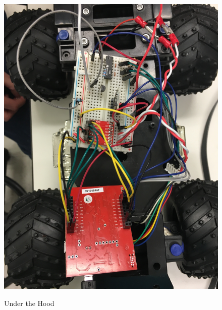 \documentclass[12pt]{article}
\begin{document}
\begin{figure}[H]
\begin {center}
\includegraphics[scale=.10]{car-guts}\\
\caption{Under the Hood}
\label{fig:hood}
\end {center}
\end{figure}
\end{document}
